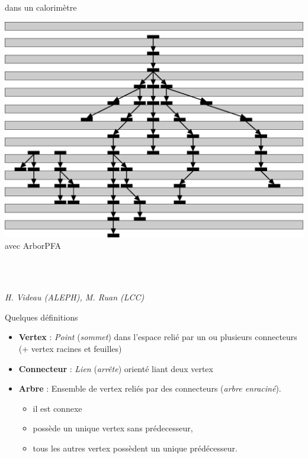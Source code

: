\documentclass[8pt]{beamer}
\begin{document}
\begin{frame}
\begin{minipage}{0.325\linewidth}
\begin{center}
      dans un calorimètre
    \end{center}
  \end{minipage}\hfill
  \begin{minipage}{0.325\linewidth}
    \begin{center}
      \pause
      \includegraphics[width=0.9\linewidth]{ProtonDecayCalo.pdf} \\
      avec ArborPFA
    \end{center}
  \end{minipage}
  {\footnotesize ~ \\ ~ \\}
  \hfill
  \begin{minipage}{0.32\linewidth} \footnotesize \textit{H. Videau (ALEPH), M. Ruan (LCC)} \end{minipage}
  \pause
  \begin{block}{Quelques définitions}
    \begin{itemize}
      \item \textbf{Vertex} : \textit{Point} (\textit{sommet}) dans l'espace relié par un ou plusieurs connecteurs (+ vertex racines et feuilles)
      \item \textbf{Connecteur} : \textit{Lien} (\textit{arrête}) orienté liant deux vertex
      \item \textbf{Arbre} : Ensemble de vertex reliés par des connecteurs (\textit{arbre enraciné}).
      \begin{itemize}
        \item il est connexe
        \item possède un unique vertex sans prédecesseur,
        \item tous les autres vertex possèdent un unique prédécesseur.
      \end{itemize}
    \end{itemize}
  \end{block}
  \end{frame}
\end{document}
